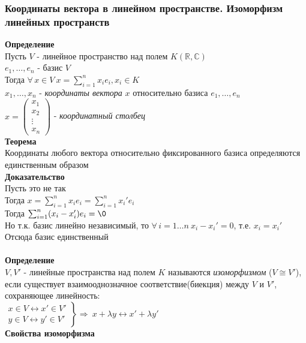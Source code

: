 \documentclass[12pt]{article}
\begin{document}
\subsubsection{Координаты вектора в линейном пространстве. Изоморфизм линейных пространств}
\textbf{Определение}\\
Пусть $V$ - линейное пространство над полем $K(\mathbb{R}, \mathbb{C})$\\
$e_1, \ldots, e_n$ - базис $V$\\
Тогда $\forall\,x\in V\ x=\sum_{i=1}^n x_i e_i, x_i \in K$\\
$x_1, \ldots, x_n$ - \textit{координаты вектора} $x$ относительно базиса $e_1, \ldots, e_n$\\
$x = \begin{pmatrix}
     x_1\\
     x_2\\
     \vdots\\
     x_n
\end{pmatrix}$ - \textit{координатный столбец}\\
\textbf{Теорема}\\
Координаты любого вектора относительно фиксированного базиса определяются единственным образом\\
\textbf{Доказательство}\\
Пусть это не так\\
Тогда $x = \sum_{i=1}^n x_ie_i = \sum_{i=1}^n x_i'e_i$\\
Тогда $\sum_{i=1}^n (x_i - x_i') e_i = \0$\\
Но т.к. базис линейно независимый, то $\forall\,i = 1\ldots n\ x_i-x_i' = 0$, т.е. $x_i = x_i'$\\
Отсюда базис единственный\\\\
\textbf{Определение}\\
$V, V'$ - линейные пространства над полем $K$ называются \textit{изоморфизмом} ($V \cong V'$), если существует взаимооднозначное соответствие(биекция) между $V$ и $V'$, сохраняющее линейность:\\
$\left.\begin{array}{c}
     x \in V \leftrightarrow x'\in V'\\
     y \in V \leftrightarrow y' \in V'
\end{array}\right\} \Rightarrow\ x+\lambda y \leftrightarrow x' + \lambda y'$\\
\textbf{Свойства изоморфизма}
\end{document}
